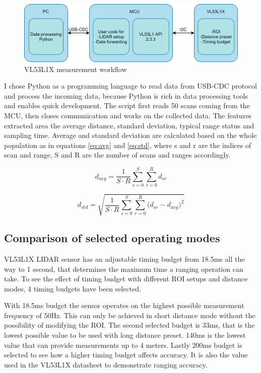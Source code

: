 \begin{figure}[ht]
    \centering
    \includegraphics[width=130mm, keepaspectratio]{figures/vl53l1x_workflow.png}
    \caption{VL53L1X measurement workflow}
    \label{fig:vl53l1x_workflow}
\end{figure}


I chose Python as a programming language to read data from USB-CDC protocol and process the incoming
data, because Python is rich in data processing tools and enables quick development. The script first
reads 50 scans coming from the MCU, then closes communication and works on the collected data. 
The features extracted area the average distance, standard deviation, typical range status and sampling
time. Average and standard deviation are calculated based on the whole population as in equations 
\ref{eq:avg} and \ref{eq:std}, where s and r are the indices of scan and range, S and R are the 
number of scans and ranges accordingly.

\begin{equation} \label{eq:avg}
    d_{avg}=\frac{1}{S \cdot R}\sum_{s=0}^S{\sum_{r=0}^R{d_{sr}} } 
\end{equation}

\begin{equation} \label{eq:std}
    d_{std}=\sqrt{ \frac{1}{S\cdot R}\sum_{s=0}^S{ \sum_{r=0}^R{ (d_{sr} -d_{avg}})^2 }}
\end{equation}


\subsection{Comparison of selected operating modes}
VL53L1X LIDAR sensor has an adjustable timing budget from 18.5ms all the way to 1 second, that 
determines the maximum time a ranging operation can take. To see the effect of timing budget with 
different ROI setups and distance modes, 4 timing budgets have been selected. 

With 18.5ms budget the sensor operates on the highest possible measurement frequency of 50Hz. This
can only be achieved in short distance mode without the possibility of modifying the ROI. The second
selected budget is 33ms, that is the lowest possible value to be used with long distance preset.
140ms is the lowest value that can provide measurements up to 4 meters. Lastly 200ms budget is 
selected to see how a higher timing budget affects accuracy. It is also the value used in the 
VL53L1X datasheet\cite{VL53L1XDatasheet} to demonstrate ranging accuracy.

